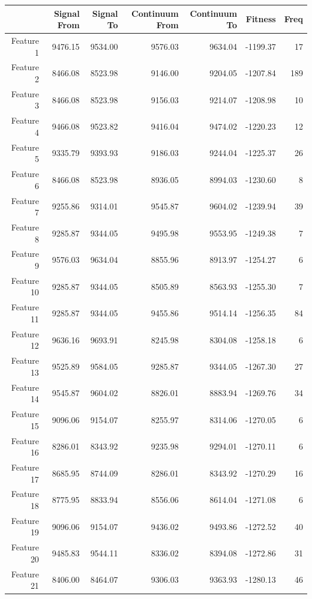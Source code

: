 {{\begin{table}
\begin{center}
\begin{tabular}{rrrrrrr}
  \hline
 & Signal From & Signal To & Continuum From & Continuum To & Fitness & Freq \\ 
  \hline
Feature 1 & 9476.15 & 9534.00 & 9576.03 & 9634.04 & -1199.37 &  17 \\ 
  Feature 2 & 8466.08 & 8523.98 & 9146.00 & 9204.05 & -1207.84 & 189 \\ 
  Feature 3 & 8466.08 & 8523.98 & 9156.03 & 9214.07 & -1208.98 &  10 \\ 
  Feature 4 & 9466.08 & 9523.82 & 9416.04 & 9474.02 & -1220.23 &  12 \\ 
  Feature 5 & 9335.79 & 9393.93 & 9186.03 & 9244.04 & -1225.37 &  26 \\ 
  Feature 6 & 8466.08 & 8523.98 & 8936.05 & 8994.03 & -1230.60 &   8 \\ 
  Feature 7 & 9255.86 & 9314.01 & 9545.87 & 9604.02 & -1239.94 &  39 \\ 
  Feature 8 & 9285.87 & 9344.05 & 9495.98 & 9553.95 & -1249.38 &   7 \\ 
  Feature 9 & 9576.03 & 9634.04 & 8855.96 & 8913.97 & -1254.27 &   6 \\ 
  Feature 10 & 9285.87 & 9344.05 & 8505.89 & 8563.93 & -1255.30 &   7 \\ 
  Feature 11 & 9285.87 & 9344.05 & 9455.86 & 9514.14 & -1256.35 &  84 \\ 
  Feature 12 & 9636.16 & 9693.91 & 8245.98 & 8304.08 & -1258.18 &   6 \\ 
  Feature 13 & 9525.89 & 9584.05 & 9285.87 & 9344.05 & -1267.30 &  27 \\ 
  Feature 14 & 9545.87 & 9604.02 & 8826.01 & 8883.94 & -1269.76 &  34 \\ 
  Feature 15 & 9096.06 & 9154.07 & 8255.97 & 8314.06 & -1270.05 &   6 \\ 
  Feature 16 & 8286.01 & 8343.92 & 9235.98 & 9294.01 & -1270.11 &   6 \\ 
  Feature 17 & 8685.95 & 8744.09 & 8286.01 & 8343.92 & -1270.29 &  16 \\ 
  Feature 18 & 8775.95 & 8833.94 & 8556.06 & 8614.04 & -1271.08 &   6 \\ 
  Feature 19 & 9096.06 & 9154.07 & 9436.02 & 9493.86 & -1272.52 &  40 \\ 
  Feature 20 & 9485.83 & 9544.11 & 8336.02 & 8394.08 & -1272.86 &  31 \\ 
  Feature 21 & 8406.00 & 8464.07 & 9306.03 & 9363.93 & -1280.13 &  46 \\ 

\end{tabular}
\end{center}
\end{table}}}
